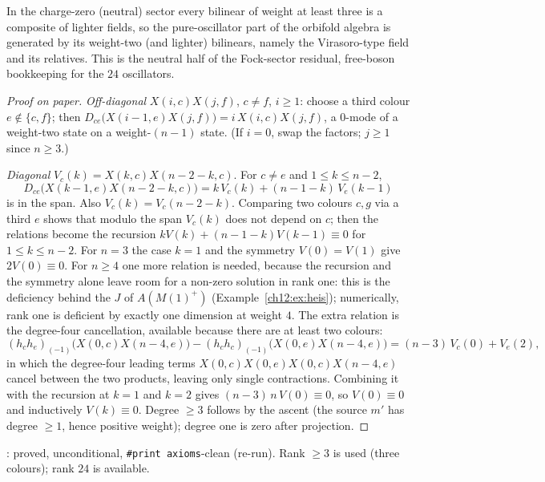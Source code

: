 \begin{physics}
In the charge-zero (neutral) sector every bilinear of weight at least three is a composite of lighter fields, so the pure-oscillator part of the orbifold algebra is generated by its weight-two (and lighter) bilinears, namely the Virasoro-type field and its relatives. This is the neutral half of the Fock-sector residual, free-boson bookkeeping for the $24$ oscillators.
\end{physics}
\begin{proof}[Proof on paper]
\emph{Off-diagonal} $X(i,c)X(j,f)$, $c\neq f$, $i\ge1$: choose a third colour $e\notin\{c,f\}$; then
$D_{ce}\big(X(i-1,e)X(j,f)\big)=i\,X(i,c)X(j,f)$, a $0$-mode of a weight-two state on a weight-$(n-1)$
state.  (If $i=0$, swap the factors; $j\ge1$ since $n\ge3$.)

\emph{Diagonal} $V_c(k)=X(k,c)X(n-2-k,c)$.  For $c\neq e$ and $1\le k\le n-2$,
\begin{equation*}
  D_{ce}\big(X(k-1,e)X(n-2-k,c)\big) = k\,V_c(k)+(n-1-k)\,V_e(k-1)
\end{equation*}
is in the span.  Also $V_c(k)=V_c(n-2-k)$.  Comparing two colours $c,g$ via a third $e$ shows that
modulo the span $V_c(k)$ does not depend on $c$; then the relations become the recursion
$kV(k)+(n-1-k)V(k-1)\equiv0$ for $1\le k\le n-2$.  For $n=3$ the case $k=1$ and the symmetry
$V(0)=V(1)$ give $2V(0)\equiv0$.  For $n\ge4$ one more relation is needed, because the recursion and
the symmetry alone leave room for a non-zero solution in rank one: this is the deficiency behind the $J$
of $A(M(1)^+)$ (Example~\ref{ch12:ex:heis}); numerically, rank one is deficient by exactly one dimension
at weight $4$.  The extra relation is the degree-four cancellation, available because there are at
least two colours:
\begin{equation*}
 (h_ch_e)_{(-1)}\big(X(0,c)X(n-4,e)\big)-(h_ch_c)_{(-1)}\big(X(0,e)X(n-4,e)\big) = (n-3)\,V_c(0)+V_e(2),
\end{equation*}
in which the degree-four leading terms $X(0,c)X(0,e)X(0,c)X(n-4,e)$ cancel between the two products,
leaving only single contractions.  Combining it with the recursion at $k=1$ and $k=2$ gives $(n-3)\,n\,V(0)\equiv0$, so $V(0)\equiv0$
and inductively $V(k)\equiv0$.  Degree $\ge3$ follows by the ascent (the source $m'$ has degree $\ge1$, hence
positive weight); degree one is zero after projection.
\end{proof}
\begin{status}: proved, unconditional, \texttt{\#print axioms}-clean (re-run).  Rank
$\ge3$ is used (three colours); rank $24$ is available.\end{status}

